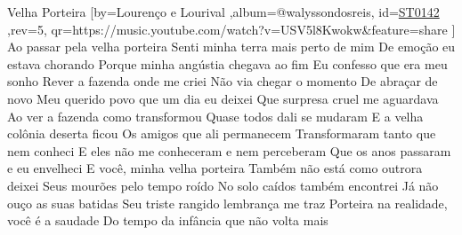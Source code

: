 \beginsong
{Velha Porteira %
}[by={Lourenço e Lourival %
},album={@walyssondosreis},
id={\href{https://music.youtube.com/watch?v=USV5l8Kwokw&feature=share %
}{ST0142 %
}},rev={5}, %
qr={https://music.youtube.com/watch?v=USV5l8Kwokw&feature=share %
}]
\beginverse
Ao passar pela velha porteira
Senti minha terra mais perto de mim
De emoção eu estava chorando
Porque minha angústia chegava ao fim
\endverse
\beginverse
Eu confesso que era meu sonho
Rever a fazenda onde me criei
Não via chegar o momento 
De abraçar de novo
Meu querido povo que um dia eu deixei
\endverse
{}
\beginverse
Que surpresa cruel me aguardava
Ao ver a fazenda como transformou
Quase todos dali se mudaram
E a velha colônia deserta ficou
\endverse
\beginverse
Os amigos que ali permanecem
Transformaram tanto que nem conheci
E eles não me conheceram e nem perceberam
Que os anos passaram e eu envelheci
\endverse
{}
\beginverse
E você, minha velha porteira
Também não está como outrora deixei
Seus mourões pelo tempo roído
No solo caídos também encontrei
\endverse
\beginverse
Já não ouço as suas batidas
Seu triste rangido lembrança me traz
Porteira na realidade, você é a saudade
Do tempo da infância que não volta mais
\endverse
{}

